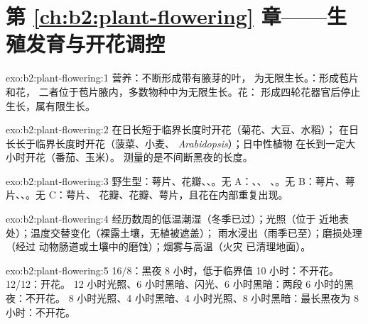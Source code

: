 \section*{第 \ref{ch:b2:plant-flowering} 章——生殖发育与开花调控}

\begin{solution}{exo:b2:plant-flowering:1}
营养：不断形成带有腋芽的叶，
为无限生长。：形成苞片和花，
二者位于苞片腋内，多数物种中为无限生长。花：
形成四轮花器官后停止生长，属有限生长。
\end{solution}

\begin{solution}{exo:b2:plant-flowering:2}
在日长短于临界长度时开花（菊花、大豆、水稻）；
在日长长于临界长度时开花（菠菜、小麦、
\emph{Arabidopsis}）；日中性植物
在长到一定大小时开花（番茄、玉米）。
测量的是不间断黑夜的长度。
\end{solution}

\begin{solution}{exo:b2:plant-flowering:3}
野生型：萼片、花瓣、、。无 A：、、
、。无 B：萼片、萼片、、。无 C：萼片、
花瓣、花瓣、萼片，且花在内部重复出现。
\end{solution}

\begin{solution}{exo:b2:plant-flowering:4}
经历数周的低温潮湿（冬季已过）；光照（位于
近地表处）；温度交替变化（裸露土壤，无植被遮盖）；
雨水浸出（雨季已至）；磨损处理（经过
动物肠道或土壤中的磨蚀）；烟雾与高温（火灾
已清理地面）。
\end{solution}

\begin{solution}{exo:b2:plant-flowering:5}
16/8：黑夜 8 小时，低于临界值 10 小时：不开花。12/12：开花。
12 小时光照、6 小时黑暗、闪光、6 小时黑暗：两段 6 小时的黑夜：不开花。
8 小时光照、4 小时黑暗、4 小时光照、8 小时黑暗：最长黑夜为 8 小时：不开花。
\end{solution}

